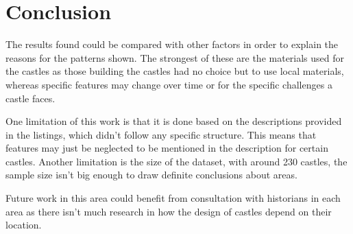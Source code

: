 \documentclass[11pt]{article}
\begin{document}

\section{Conclusion}

The results found could be compared with other factors in order to explain the reasons for the patterns shown. The strongest of these are the materials used for the castles as those building the castles had no choice but to use local materials, whereas specific features may change over time or for the specific challenges a castle faces.

One limitation of this work is that it is done based on the descriptions provided in the listings, which didn't follow any specific structure. This means that features may just be neglected to be mentioned in the description for certain castles. Another limitation is the size of the dataset, with around 230 castles, the sample size isn't big enough to draw definite conclusions about areas.

Future work in this area could benefit from consultation with historians in each area as there isn't much research in how the design of castles depend on their location.


\newpage
\printbibliography
\end{document}

